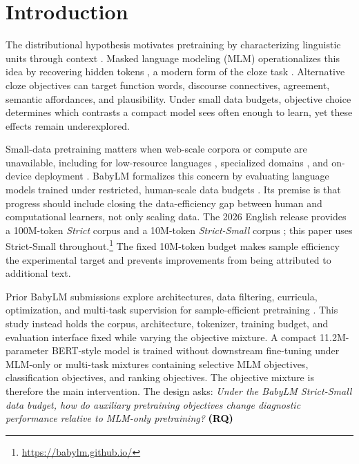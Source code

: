 \documentclass[11pt]{article}
\begin{document}
\section{Introduction}

The distributional hypothesis motivates pretraining by characterizing linguistic units through context \citep{harris1954distributional}.
Masked language modeling (MLM) operationalizes this idea by recovering hidden tokens \citep{devlin2019bert}, a modern form of the cloze task \citep{taylor1953cloze}.
Alternative cloze objectives can target function words, discourse connectives, agreement, semantic affordances, and plausibility.
Under small data budgets, objective choice determines which contrasts a compact model sees often enough to learn, yet these effects remain underexplored.

Small-data pretraining matters when web-scale corpora or compute are unavailable, including for low-resource languages \citep{joshi2020state}, specialized domains \citep{gururangan2020dont}, and on-device deployment \citep{lu2025demystifying}.
BabyLM formalizes this concern by evaluating language models trained under restricted, human-scale data budgets \citep{warstadt2023babylm}.
Its premise is that progress should include closing the data-efficiency gap between human and computational learners, not only scaling data.
The 2026 English release provides a 100M-token \textit{Strict} corpus and a 10M-token \textit{Strict-Small} corpus \citep{choshen2026babylmturns4}; this paper uses Strict-Small throughout.\footnote{\url{https://babylm.github.io/}}
The fixed 10M-token budget makes sample efficiency the experimental target and prevents improvements from being attributed to additional text.

Prior BabyLM submissions explore architectures, data filtering, curricula, optimization, and multi-task supervision for sample-efficient pretraining \citep{warstadt2023babylm,haller2024babyhgrn,kamzela2025llm}.
This study instead holds the corpus, architecture, tokenizer, training budget, and evaluation interface fixed while varying the objective mixture.
A compact 11.2M-parameter BERT-style model is trained without downstream fine-tuning under MLM-only or multi-task mixtures containing selective MLM objectives, classification objectives, and ranking objectives.
The objective mixture is therefore the main intervention.
The design asks: \emph{Under the BabyLM Strict-Small data budget, how do auxiliary pretraining objectives change diagnostic performance relative to MLM-only pretraining?} \hypertarget{rq:main}{\textcolor{black}{\textbf{(RQ)}}}
\end{document}

